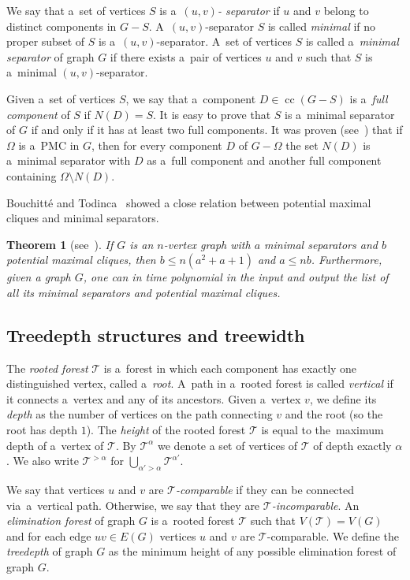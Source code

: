 \documentclass[11pt,a4paper]{article}
\DeclareMathOperator{\cc}{cc}
\newtheorem{theorem}{Theorem}[section]
\theoremstyle{definition}
\def\T{\mathcal{T}}
\begin{document}
We say that a~set of vertices $S$ is a~{\it $(u,v)$- separator} if $u$ and $v$ belong to distinct components in $G-S$. A~$(u,v)$-separator $S$ is called {\it minimal} if no proper subset of $S$ is a~$(u,v)$-separator. A~set of vertices $S$ is called a~{\it minimal separator} of graph $G$ if there exists a~pair of vertices $u$ and $v$ such that $S$ is a~minimal $(u,v)$-separator. 

Given a~set of vertices $S$, we say that a~component $D\in \cc(G-S)$ is a~{\it full component} of $S$ if $N(D)=S$. It is easy to prove that $S$ is a~minimal separator of $G$ if and only if it has at least two full components. 
It was proven (see~\cite{Todinca}) that if $\Omega$ is a~PMC in $G$, then for every component $D$ of $G-\Omega$ the set $N(D)$ is a~minimal separator with $D$ as a~full component and another full component containing $\Omega\setminus N(D)$.

Bouchitt\'e and Todinca~\cite{BouchitteT02,Todinca} showed a close relation between potential maximal cliques and minimal separators.

\begin{theorem}[see~\cite{BouchitteT02,Todinca}]\label{thm:minsep-pmc}
If $G$ is an $n$-vertex graph with $a$ minimal separators and $b$ potential maximal
cliques, then $b \leq n(a^2+a+1)$ and $a \leq nb$.
Furthermore, given a graph $G$, one can in time polynomial in the input and output the list of all its minimal separators and potential maximal cliques.
\end{theorem}


\subsection{Treedepth structures and treewidth}
The {\it rooted forest} $\T$ is a~forest in which each component has exactly one distinguished vertex, called a~{\it root}.
A~path in a~rooted forest is called {\it vertical} if it connects a~vertex and any of its ancestors.
Given a~vertex $v$, we define its {\it depth} as the number of vertices on the path connecting $v$ and the root (so the root has depth $1$).
The {\it height} of the rooted forest $\T$ is equal to the~maximum depth of a~vertex of $\T$.
By $\T^\alpha$ we denote a set of vertices of $\T$ of depth exactly $\alpha$.
We also write $\T^{>\alpha}$ for $\bigcup_{\alpha' > \alpha} \T^{\alpha'}$.

We say that vertices $u$ and $v$ are {\it $\T$-comparable} if they can be connected via~a~vertical path. Otherwise, we say that they are {\it $\T$-incomparable}. An {\it elimination forest} of graph $G$ is a~rooted forest $\T$ such that $V(\T)=V(G)$ and for each edge $uv\in E(G)$ vertices $u$ and $v$ are $\T$-comparable. We define the {\it treedepth} of graph $G$ as the minimum height of any possible elimination forest of graph $G$.
\end{document}
